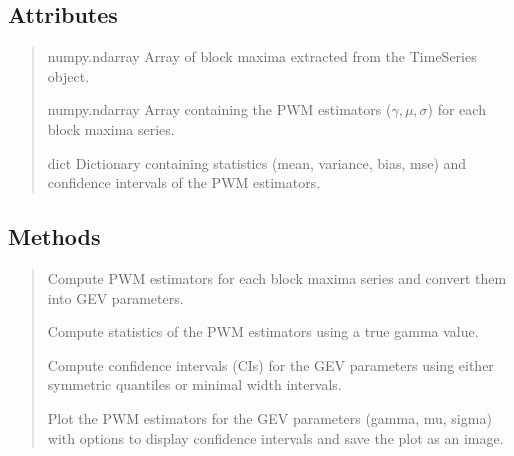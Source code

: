 \documentclass[a4paper,11pt,openany,english]{sphinxmanual}
\begin{document}
\begin{fulllineitems}
\begin{quote}
\begin{description}
\end{description}\end{quote}


\subsection{Attributes}
\label{\detokenize{api_topt:id24}}\begin{quote}\begin{description}
\sphinxAtStartPar
numpy.ndarray
Array of block maxima extracted from the TimeSeries object.

\sphinxAtStartPar
numpy.ndarray
Array containing the PWM estimators (\(\gamma, \mu, \sigma\)) for each block maxima series.

\sphinxAtStartPar
dict
Dictionary containing statistics (mean, variance, bias, mse) and confidence intervals of the PWM estimators.

\end{description}\end{quote}


\subsection{Methods}
\label{\detokenize{api_topt:id25}}\begin{quote}\begin{description}
\sphinxAtStartPar
Compute PWM estimators for each block maxima series and convert them into GEV parameters.

\sphinxAtStartPar
Compute statistics of the PWM estimators using a true gamma value.

\sphinxAtStartPar
Compute confidence intervals (CIs) for the GEV parameters using either symmetric quantiles or minimal width intervals.

\sphinxAtStartPar
Plot the PWM estimators for the GEV parameters (gamma, mu, sigma) with options to display confidence intervals and save the plot as an image.

\end{description}\end{quote}



\end{fulllineitems}
\end{document}
